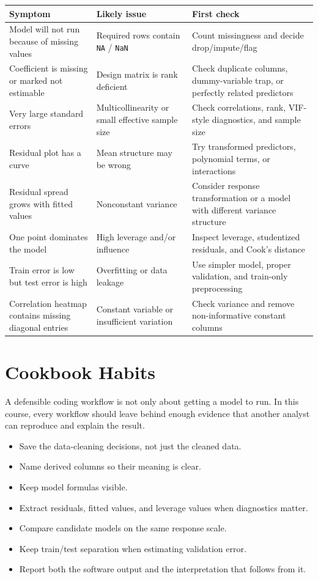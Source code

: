 \begin{center}
\begin{tabular}{p{}p{}p{}}
\hline
Symptom & Likely issue & First check \\
\hline
Model will not run because of missing values & Required rows contain \texttt{NA} / \texttt{NaN} & Count missingness and decide drop/impute/flag \\
Coefficient is missing or marked not estimable & Design matrix is rank deficient & Check duplicate columns, dummy-variable trap, or perfectly related predictors \\
Very large standard errors & Multicollinearity or small effective sample size & Check correlations, rank, VIF-style diagnostics, and sample size \\
Residual plot has a curve & Mean structure may be wrong & Try transformed predictors, polynomial terms, or interactions \\
Residual spread grows with fitted values & Nonconstant variance & Consider response transformation or a model with different variance structure \\
One point dominates the model & High leverage and/or influence & Inspect leverage, studentized residuals, and Cook's distance \\
Train error is low but test error is high & Overfitting or data leakage & Use simpler model, proper validation, and train-only preprocessing \\
Correlation heatmap contains missing diagonal entries & Constant variable or insufficient variation & Check variance and remove non-informative constant columns \\
\hline
\end{tabular}
\end{center}

\section{Cookbook Habits}
\label{app:cookbook-habits}

A defensible coding workflow is not only about getting a model to run.  In this course, every workflow should leave behind enough evidence that another analyst can reproduce and explain the result.

\begin{itemize}
  \item Save the data-cleaning decisions, not just the cleaned data.
  \item Name derived columns so their meaning is clear.
  \item Keep model formulas visible.
  \item Extract residuals, fitted values, and leverage values when diagnostics matter.
  \item Compare candidate models on the same response scale.
  \item Keep train/test separation when estimating validation error.
  \item Report both the software output and the interpretation that follows from it.
\end{itemize}
